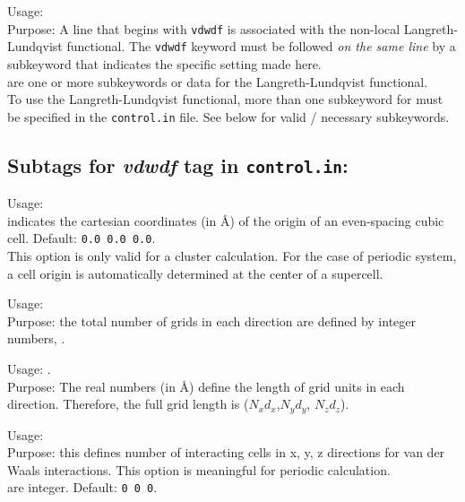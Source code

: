 {
  \noindent
  Usage:   \\[1.0ex]
  Purpose: A line that begins with \texttt{vdwdf} is associated with the
  non-local Langreth-Lundqvist functional. The \texttt{vdwdf} keyword must be
  followed \emph{on the same line} by a subkeyword that indicates the specific
  setting made here. \\[1.0ex]  
   are one or more subkeywords or data for the
  Langreth-Lundqvist functional. \\
}
To use the Langreth-Lundqvist functional, more than one subkeyword for
 must be specified in the \texttt{control.in} file. See below
for valid / necessary subkeywords.


\subsection*{Subtags for \emph{vdwdf} tag in \texttt{control.in}:}
  {
  \noindent
  Usage:   \\[1.0ex]
   indicates the cartesian coordinates (in {\AA})
  of the origin of an even-spacing cubic cell. Default: \texttt{0.0
    0.0
    0.0}.\\
} This option is only valid for a cluster calculation. For the case of
periodic system, a cell origin is automatically determined at the
center of a supercell.

 {
  \noindent
  Usage:   \\[1.0ex]
  Purpose: the total number of grids in each direction are defined
  by integer numbers, .\\
}

 {
  \noindent
  Usage:  . \\[1.0ex]
  Purpose: The real numbers  (in
  {\AA}) define the length of grid units in each direction. Therefore,
  the full grid length is ($N_x d_x$,$N_y d_y$, $N_z d_z$).  }

 {
  \noindent
  Usage:   \\[1.0ex]
  Purpose: this defines number of interacting cells in x, y, z
  directions for van der Waals interactions. This option is meaningful
  for periodic calculation.\\[1.0ex] 
  are
  integer. Default: \texttt{0 0 0}.\\
}

